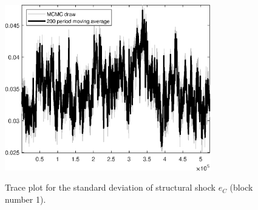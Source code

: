 \begin{figure}[H]
\centering
  \includegraphics[width=0.8\textwidth]{BRS_growth_KPR/graphs/TracePlot_SE_e_C_blck_1}\\
    \caption{Trace plot for the standard deviation of structural shock ${e_C}$ (block number 1).}
\end{figure}
